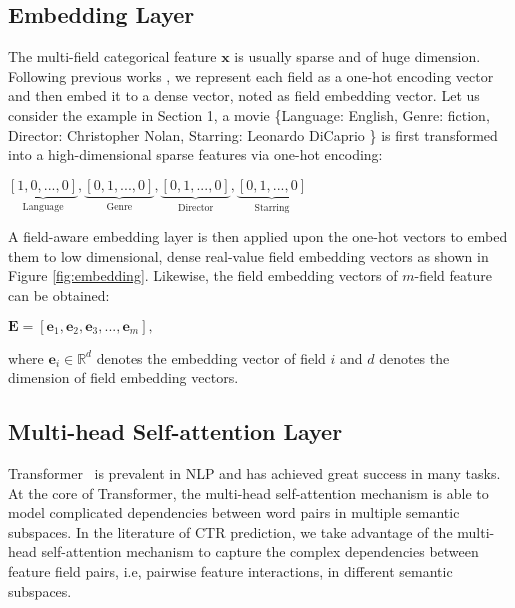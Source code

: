 \documentclass[sigconf]{acmart}
\begin{document}
\subsection{Embedding Layer} \label{sect:graph}
The multi-field categorical feature  $\mathbf{x}$ is usually sparse and of huge dimension.
Following previous works \cite{zhang2016deep,qu2016product,wang2017deep,guo2017deepfm,qu2018product}, we represent each field as a one-hot encoding vector and then embed it to a dense vector, noted as field embedding vector.
Let us consider the example in Section 1, 
a movie \textsf{\{Language: English, Genre: fiction, Director: Christopher Nolan, Starring: Leonardo DiCaprio \}} is first transformed into a high-dimensional sparse features via one-hot encoding:
\begin{center}	
$ \underbrace{\left [ 1, 0, ..., 0  \right ]}_{\text{Language}}, \underbrace{\left [ 0, 1, ..., 0 \right ]}_{\text{Genre}}, \underbrace{\left [ 0, 1, ..., 0  \right ]}_{\text{Director}}, \underbrace{\left [ 0, 1, ..., 0  \right ]}_{\text{Starring}}$
 \end{center}	
A field-aware embedding layer is then applied upon the one-hot vectors to embed them to low dimensional, dense real-value field embedding vectors as shown in Figure \ref{fig:embedding}.
Likewise, the field embedding vectors of $m$-field feature can be obtained: 
\begin{center}	
$ \mathbf{E} = \left [ \mathbf{e}_{1}, \mathbf{e}_{2}, \mathbf{e}_{3}, ..., \mathbf{e}_{m} \right ], $
\end{center}
where $\mathbf{e}_{i} \in \mathbb{R}^{d}$ denotes the embedding vector of field $i$ and $d$ denotes the dimension of field embedding vectors.

\subsection{Multi-head Self-attention Layer} 
Transformer~\cite{vaswani2017attention} is prevalent in NLP and has achieved great success in many tasks.
At the core of Transformer, the multi-head self-attention mechanism is able to model complicated dependencies between word pairs in multiple semantic subspaces.
In the literature of CTR prediction, we take advantage of the multi-head self-attention mechanism to capture the complex dependencies between feature field pairs, i.e, pairwise feature interactions, in different semantic subspaces.
\end{document}
